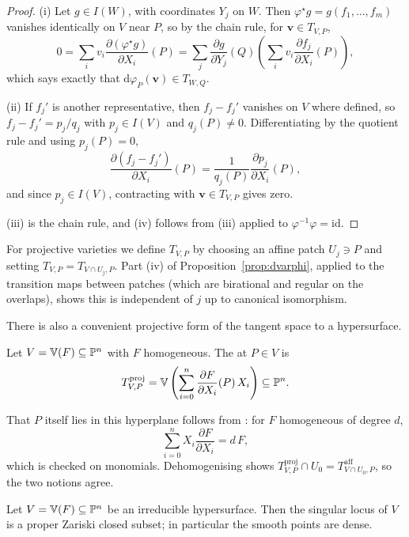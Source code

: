 \documentclass[a4paper]{scrartcl}
\newcommand{\V}{\mathbb{V}}
\newcommand{\dee}{\mathrm{d}}
\begin{document}
\begin{proof}
	(i) Let $g \in I(W)$, with coordinates $Y_j$ on $W$. Then $\varphi^\star g = g(f_1,\dots,f_m)$ vanishes identically on $V$ near $P$, so by the chain rule, for $\mathbf v \in T_{V,P}$,
	$$0 = \sum_i v_i \frac{\partial (\varphi^\star g)}{\partial X_i}(P) = \sum_j \frac{\partial g}{\partial Y_j}(Q)\left(\sum_i v_i \frac{\partial f_j}{\partial X_i}(P)\right),$$
	which says exactly that $\dee\varphi_P(\mathbf v) \in T_{W,Q}$.

	(ii) If $f_j'$ is another representative, then $f_j - f_j'$ vanishes on $V$ where defined, so $f_j - f_j' = p_j/q_j$ with $p_j \in I(V)$ and $q_j(P) \neq 0$. Differentiating by the quotient rule and using $p_j(P) = 0$,
	$$\frac{\partial (f_j - f_j')}{\partial X_i}(P) = \frac{1}{q_j(P)}\frac{\partial p_j}{\partial X_i}(P),$$
	and since $p_j \in I(V)$, contracting with $\mathbf v \in T_{V,P}$ gives zero.

	(iii) is the chain rule, and (iv) follows from (iii) applied to $\varphi^{-1}\varphi = \mathrm{id}$.
\end{proof}

For projective varieties we define $T_{V,P}$ by choosing an affine patch $U_j \ni P$ and setting $T_{V,P} = T_{V\cap U_j, P}$. Part (iv) of Proposition~\ref{prop:dvarphi}, applied to the transition maps between patches (which are birational and regular on the overlaps), shows this is independent of $j$ up to canonical isomorphism.

There is also a convenient projective form of the tangent space to a hypersurface.

\begin{definition}
	Let $V = \V(F) \subseteq \PP^n$ with $F$ homogeneous. The  at $P \in V$ is
	$$T^{\mathrm{proj}}_{V,P} = \V\left(\sum_{i=0}^n \frac{\partial F}{\partial X_i}(P)\,X_i\right) \subseteq \PP^n.$$
\end{definition}

That $P$ itself lies in this hyperplane follows from : for $F$ homogeneous of degree $d$,
$$\sum_{i=0}^n X_i\frac{\partial F}{\partial X_i} = d\,F,$$
which is checked on monomials. Dehomogenising shows $T^{\mathrm{proj}}_{V,P} \cap U_0 = T^{\mathrm{aff}}_{V\cap U_0, P}$, so the two notions agree.

\begin{proposition}\label{prop:singclosed}
	Let $V = \V(F) \subseteq \PP^n$ be an irreducible hypersurface. Then the singular locus of $V$ is a proper Zariski closed subset; in particular the smooth points are dense.
\end{proposition}
\end{document}
